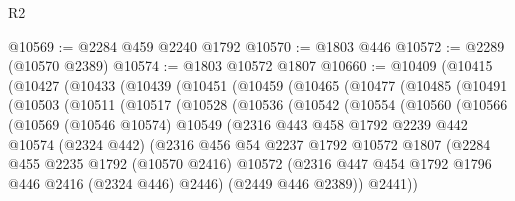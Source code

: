 \begin{lexlean}{R2}
\begin{coremodule}
@10569 := @2284 @459 @2240 @1792
@10570 := @1803 @446
@10572 := @2289 (@10570 @2389)
@10574 := @1803 @10572 @1807
@10660 := @10409
    (@10415
      (@10427
        (@10433
          (@10439
            (@10451
              (@10459
                (@10465
                  (@10477
                    (@10485
                      (@10491
                        (@10503
                          (@10511
                            (@10517
                              (@10528
                                (@10536
                                  (@10542
                                    (@10554
                                      (@10560
                                        (@10566
                                          (@10569
                                            (@10546 @10574)
                                            @10549
                                            (@2316
                                              @443
                                              @458
                                              @1792
                                              @2239
                                              @442
                                              @10574
                                              (@2324 @442)
                                              (@2316
                                                @456
                                                @54
                                                @2237
                                                @1792
                                                @10572
                                                @1807
                                                (@2284
                                                  @455
                                                  @2235
                                                  @1792
                                                  (@10570 @2416)
                                                  @10572
                                                  (@2316
                                                    @447
                                                    @454
                                                    @1792
                                                    @1796
                                                    @446
                                                    @2416
                                                    (@2324 @446)
                                                    @2446)
                                                  (@2449 @446 @2389))
                                                @2441))

\end{coremodule}
\end{lexlean}
